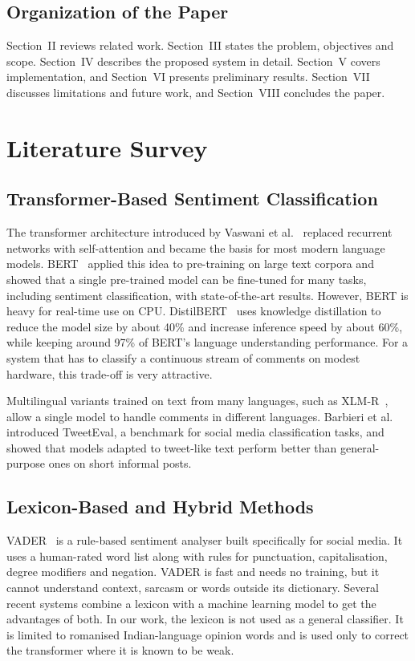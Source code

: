 \documentclass[conference]{IEEEtran}
\begin{document}
\subsection{Organization of the Paper}
Section~II reviews related work. Section~III states the problem, objectives and scope. Section~IV
describes the proposed system in detail. Section~V covers implementation, and Section~VI presents
preliminary results. Section~VII discusses limitations and future work, and Section~VIII concludes
the paper.

\section{Literature Survey}

\subsection{Transformer-Based Sentiment Classification}
The transformer architecture introduced by Vaswani et al.~\cite{b11} replaced recurrent networks with
self-attention and became the basis for most modern language models. BERT~\cite{b1} applied this
idea to pre-training on large text corpora and showed that a single pre-trained model can be
fine-tuned for many tasks, including sentiment classification, with state-of-the-art results.
However, BERT is heavy for real-time use on CPU. DistilBERT~\cite{b2} uses knowledge distillation to
reduce the model size by about 40\% and increase inference speed by about 60\%, while keeping around
97\% of BERT's language understanding performance. For a system that has to classify a continuous
stream of comments on modest hardware, this trade-off is very attractive.

Multilingual variants trained on text from many languages, such as XLM-R~\cite{b12}, allow a single
model to handle comments in different languages. Barbieri et al.~\cite{b10} introduced TweetEval, a
benchmark for social media classification tasks, and showed that models adapted to tweet-like text
perform better than general-purpose ones on short informal posts.

\subsection{Lexicon-Based and Hybrid Methods}
VADER~\cite{b3} is a rule-based sentiment analyser built specifically for social media. It uses a
human-rated word list along with rules for punctuation, capitalisation, degree modifiers and
negation. VADER is fast and needs no training, but it cannot understand context, sarcasm or words
outside its dictionary. Several recent systems combine a lexicon with a machine learning model to get
the advantages of both. In our work, the lexicon is not used as a general classifier. It is limited
to romanised Indian-language opinion words and is used only to correct the transformer where it is
known to be weak.
\end{document}
